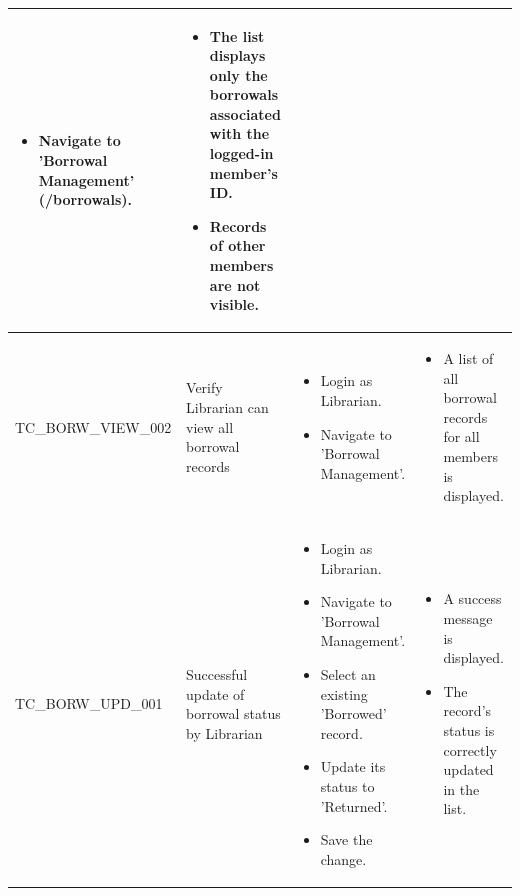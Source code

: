 \begin{longtable}{|>{\scriptsize\raggedright\arraybackslash}p{3.8cm}|>{\raggedright\arraybackslash}p{3.8cm}|>{\raggedright\arraybackslash}p{4cm}|>{\raggedright\arraybackslash}p{4cm}|}
\begin{itemize}[noitemsep, topsep=0pt, partopsep=0pt, leftmargin=*]
        \item Navigate to 'Borrowal Management' (/borrowals).
    \end{itemize} &
    \begin{itemize}[noitemsep, topsep=0pt, partopsep=0pt, leftmargin=*]
        \item The list displays only the borrowals associated with the logged-in member's ID.
        \item Records of other members are not visible.
    \end{itemize} \\ \hline
TC\_BORW\_VIEW\_002 & Verify Librarian can view all borrowal records &
    \begin{itemize}[noitemsep, topsep=0pt, partopsep=0pt, leftmargin=*]
        \item Login as Librarian.
        \item Navigate to 'Borrowal Management'.
    \end{itemize} &
    \begin{itemize}[noitemsep, topsep=0pt, partopsep=0pt, leftmargin=*]
        \item A list of all borrowal records for all members is displayed.
    \end{itemize} \\ \hline
TC\_BORW\_UPD\_001 & Successful update of borrowal status by Librarian &
    \begin{itemize}[noitemsep, topsep=0pt, partopsep=0pt, leftmargin=*]
        \item Login as Librarian.
        \item Navigate to 'Borrowal Management'.
        \item Select an existing 'Borrowed' record.
        \item Update its status to 'Returned'.
        \item Save the change.
    \end{itemize} &
    \begin{itemize}[noitemsep, topsep=0pt, partopsep=0pt, leftmargin=*]
        \item A success message is displayed.
        \item The record's status is correctly updated in the list.
    \end{itemize} \\ \hline
    

\end{longtable}

